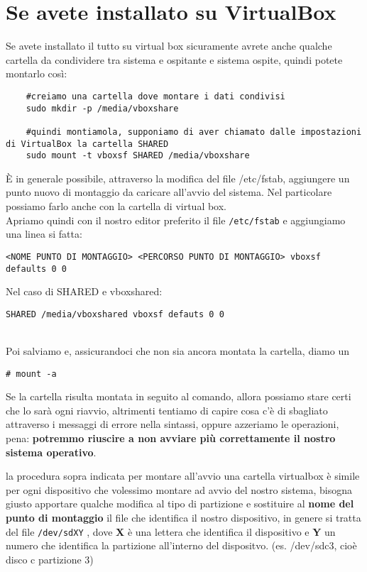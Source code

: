 \documentclass[twoside,italian]{book}
\newcommand{\nlinea}{
	\leavevmode
	\\
}
\newcommand{\centcode}[1]{
	
	\definecolor{centcode}{rgb}{0.5,0.1,0.1}
	
	\begin{center}
	 	\texttt{\textcolor{centcode}{#1}}
	\end{center}
	
	
}
\newcommand{\code}[1]{
	\texttt{\textcolor{code}{#1}}
}
\begin{document}
			
			
		\section{Se avete installato su VirtualBox}
			
			Se avete installato il tutto su virtual box sicuramente avrete anche qualche cartella da condividere tra sistema e ospitante e sistema ospite, quindi potete montarlo così:
\begin{lstlisting}
	#creiamo una cartella dove montare i dati condivisi
	sudo mkdir -p /media/vboxshare
	
	#quindi montiamola, supponiamo di aver chiamato dalle impostazioni di VirtualBox la cartella SHARED
	sudo mount -t vboxsf SHARED /media/vboxshare
\end{lstlisting}
			
			È in generale possibile, attraverso la modifica del file /etc/fstab, aggiungere un punto nuovo di montaggio da caricare all'avvio del sistema. Nel particolare possiamo farlo anche con la cartella di virtual box.\\
			Apriamo quindi con il nostro editor preferito il file \code{/etc/fstab} e aggiungiamo una linea si fatta:
			\centcode{<NOME PUNTO DI MONTAGGIO> <PERCORSO PUNTO DI MONTAGGIO> vboxsf defaults 0 0}
			Nel caso di SHARED e vboxshared:
			\centcode{SHARED	/media/vboxshared	vboxsf	defauts	0 0} 
			\nlinea
			Poi salviamo e, assicurandoci che non sia ancora montata la cartella, diamo un \centcode{\# mount -a} 
			Se la cartella risulta montata in seguito al comando, allora possiamo stare certi che lo sarà ogni riavvio, altrimenti tentiamo di capire cosa c'è di sbagliato attraverso i messaggi di errore nella sintassi, oppure azzeriamo le operazioni, pena: \textbf{potremmo riuscire a non avviare più correttamente il nostro sistema operativo}.
			
			 \begin{tcolorbox}[floatplacement=b,width=\textwidth,colback={blue},title={NOTA BENE:},colbacktitle=gray,coltitle=white,colupper=white]
			 	la procedura sopra indicata per montare all'avvio una cartella virtualbox è simile per ogni dispositivo che volessimo montare ad avvio del nostro sistema, bisogna giusto apportare qualche modifica al tipo di partizione e sostituire al \textbf{nome del punto di montaggio} il file che identifica il nostro dispositivo, in genere si tratta del file \code{/dev/sdXY}, dove \textbf{X} è una lettera che identifica il dispositivo e \textbf{Y} un numero che identifica la partizione all'interno del dispositvo. (es. /dev/sdc3, cioè disco c partizione 3)
			 \end{tcolorbox}
			
\end{document}
